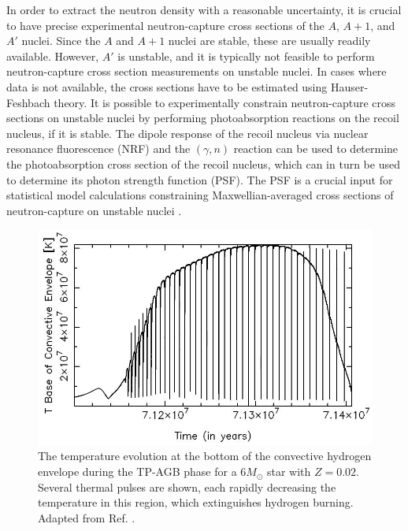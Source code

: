 In order to extract the neutron density with a reasonable uncertainty, it is crucial to have precise experimental neutron-capture cross sections of the $A$, $A+1$, and $A'$ nuclei. Since the $A$ and $A+1$ nuclei are stable, these are usually readily available. However, $A'$ is unstable, and it is typically not feasible to perform neutron-capture cross section measurements on unstable nuclei. In cases where data is not available, the cross sections have to be estimated using Hauser-Feshbach theory. It is possible to experimentally constrain neutron-capture cross sections on unstable nuclei by performing photoabsorption reactions on the recoil nucleus, if it is stable. The dipole response of the recoil nucleus via nuclear resonance fluorescence (NRF) and the $(\gamma,n)$ reaction can be used to determine the photoabsorption cross section of the recoil nucleus, which can in turn be used to determine its photon strength function (PSF). The PSF is a crucial input for statistical model calculations constraining Maxwellian-averaged cross sections of neutron-capture on unstable nuclei \cite{Wilhelmy2020}.



\begin{figure}[t]
\centering
\includegraphics[width=6.5in]{Chapter-1/figs/HBB.jpg}
\caption{\label{fig:HBB}The temperature evolution at the bottom of the convective hydrogen envelope during the TP-AGB phase for a $6 M_{\odot}$ star with $Z=0.02$. Several thermal pulses are shown, each rapidly decreasing the temperature in this region, which extinguishes hydrogen burning. Adapted from Ref. \cite{Karakas2014}.}
\end{figure}

